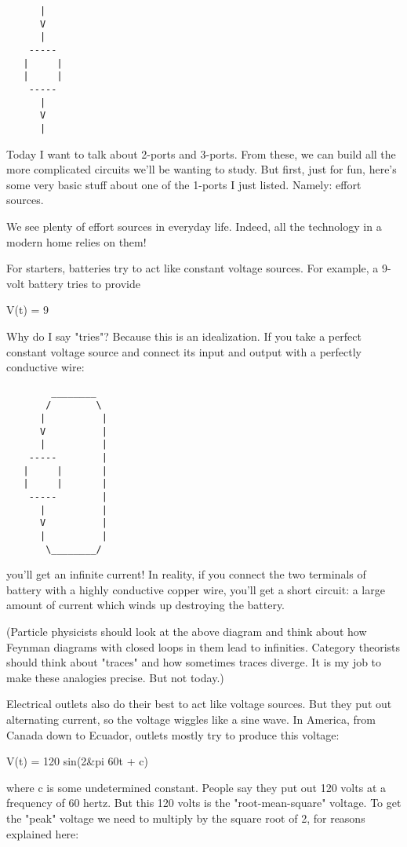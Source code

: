 \begin{verbatim}
      |
      V
      |
    -----
   |     |
   |     |
    -----
      |
      V
      |
\end{verbatim}
    

Today I want to talk about 2-ports and 3-ports.  From these, we can
build all the more complicated circuits we'll be wanting to study.
But first, just for fun, here's some very basic stuff about one of the
1-ports I just listed.  Namely: effort sources.

We see plenty of effort sources in everyday life.  Indeed, all the
technology in a modern home relies on them!  

For starters, batteries try to act like constant voltage sources.  For
example, a 9-volt battery tries to provide

V(t) = 9

Why do I say "tries"?  Because this is an idealization.  If
you take a perfect constant voltage source and connect its input and
output with a perfectly conductive wire:

\begin{verbatim}
        ________
       /        \
      |          |
      V          |
      |          |
    -----        |
   |     |       |
   |     |       |
    -----        |
      |          |
      V          |
      |          |
       \________/

\end{verbatim}
    
you'll get an infinite current!  In reality, if you connect the two
terminals of battery with a highly conductive copper wire, you'll get
a short circuit: a large amount of current which winds up destroying
the battery.

(Particle physicists should look at the above diagram and think about
how Feynman diagrams with closed loops in them lead to infinities.
Category theorists should think about "traces" and how sometimes
traces diverge.  It is my job to make these analogies precise.  But
not today.)

Electrical outlets also do their best to act like voltage sources.
But they put out alternating current, so the voltage wiggles like a
sine wave.  In America, from Canada down to Ecuador, outlets mostly
try to produce this voltage:

V(t) =  120 sin(2&pi 60t + c)
  
where c is some undetermined constant.  People say they put out 120
volts at a frequency of 60 hertz.  But this 120 volts is the
"root-mean-square" voltage.  To get the "peak"
voltage we need to multiply by the square root of 2, for reasons
explained here:

